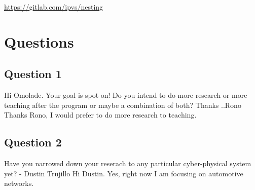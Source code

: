 \documentclass{article}
\begin{document}
\url{https://gitlab.com/ipvs/nesting}
\section{Questions}
\subsection{Question 1}

Hi Omolade. Your goal is spot on! Do you intend to do more research or more teaching after the program or maybe a combination of both? Thanks ..Rono
Thanks Rono, I would prefer to do more research to teaching.

\subsection{Question 2}
Have you narrowed down your reserach to any particular cyber-physical system yet? - Dustin Trujillo
Hi Dustin. Yes, right now I am focusing on automotive networks.
\end{document}
